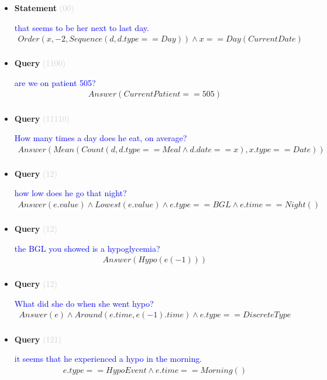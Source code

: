 \documentclass[11pt]{article}
\newcommand{\key}[1]{\textcolor{lightgray}{#1}}
\newcounter{CQuery}
\newcounter{CStatement}
\begin{document}
\begin{itemize}
\item
\textbf{Statement\theCStatement} \key{(00)} \addtocounter{CStatement}{1}
\textcolor{blue}{ that seems to be her next to last day. }
\begin{multline*}
Order(x, -2, Sequence(d, d.type==Day)) \wedge x==Day(CurrentDate) \\ 
\end{multline*}


\item
\textbf{Query\theCQuery} \key{(1100)} \addtocounter{CQuery}{1}
\textcolor{blue}{ are we on patient 505? }
\begin{multline*}
Answer(CurrentPatient==505) \\ 
\end{multline*}


\item
\textbf{Query\theCQuery} \key{(11110)} \addtocounter{CQuery}{1}
\textcolor{blue}{ How many times a day does he eat, on average? }
\begin{multline*}
Answer(Mean(Count(d, d.type==Meal \wedge d.date==x), x.type==Date)) \\ 
\end{multline*}


\item
\textbf{Query\theCQuery} \key{(12)} \addtocounter{CQuery}{1}
\textcolor{blue}{ how low does he go that night? }
\begin{multline*}
Answer(e.value) \wedge Lowest(e.value) \wedge e.type==BGL \wedge e.time==Night() \\ 
\end{multline*}


\item
\textbf{Query\theCQuery} \key{(12)} \addtocounter{CQuery}{1}
\textcolor{blue}{ the BGL you showed is a hypoglycemia? }
\begin{multline*}
Answer(Hypo(e(-1))) \\ 
\end{multline*}


\item
\textbf{Query\theCQuery} \key{(12)} \addtocounter{CQuery}{1}
\textcolor{blue}{ What did she do when she went hypo? }
\begin{multline*}
Answer(e) \wedge Around(e.time, e(-1).time) \wedge e.type==DiscreteType \\ 
\end{multline*}


\item
\textbf{Query\theCQuery} \key{(121)} \addtocounter{CQuery}{1}
\textcolor{blue}{ it seems that he experienced a hypo in the morning. }
\begin{multline*}
e.type==HypoEvent \wedge e.time==Morning() \\ 
\end{multline*}



\end{itemize}
\end{document}
